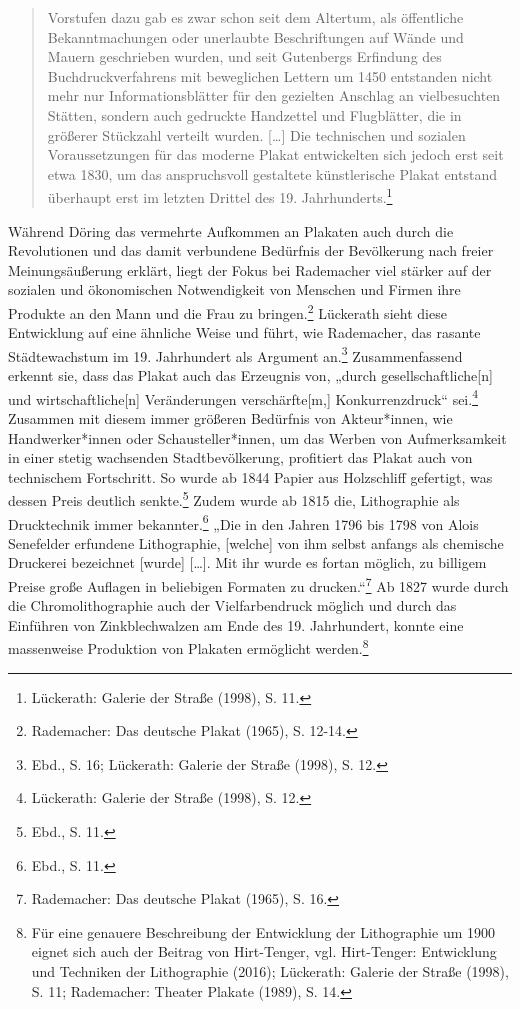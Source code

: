 \documentclass[a4paper,12pt,ngerman]{article}
\begin{document}
\blockquote{\fontsize{10pt}{12pt}\selectfont Vorstufen dazu gab es zwar schon seit dem Altertum, als öffentliche Bekanntmachungen oder unerlaubte Beschriftungen auf Wände und Mauern geschrieben wurden, und seit Gutenbergs Erfindung des Buchdruckverfahrens mit beweglichen Lettern um 1450 entstanden nicht mehr nur Informationsblätter für den gezielten Anschlag an vielbesuchten Stätten, sondern auch gedruckte Handzettel und Flugblätter, die in größerer Stückzahl verteilt wurden. […] Die technischen und sozialen Voraussetzungen für das moderne Plakat entwickelten sich jedoch erst seit etwa 1830, um das anspruchsvoll gestaltete künstlerische Plakat entstand überhaupt erst im letzten Drittel des 19. Jahrhunderts.\footnote{Lückerath: Galerie der Straße (1998), S. 11.}}


Während Döring das vermehrte Aufkommen an Plakaten auch durch die Revolutionen und das damit verbundene Bedürfnis der Bevölkerung nach freier Meinungsäußerung erklärt, liegt der Fokus bei Rademacher viel stärker auf der sozialen und ökonomischen Notwendigkeit von Menschen und Firmen ihre Produkte an den Mann und die Frau zu bringen.\footnote{Rademacher: Das deutsche Plakat (1965), S. 12-14.}  Lückerath sieht diese Entwicklung auf eine ähnliche Weise und führt, wie Rademacher, das rasante Städtewachstum im 19. Jahrhundert als Argument an.\footnote{Ebd., S. 16; Lückerath: Galerie der Straße (1998), S. 12.}  Zusammenfassend erkennt sie, dass das Plakat auch das Erzeugnis von, „durch gesellschaftliche[n] und wirtschaftliche[n] Veränderungen verschärfte[m,] Konkurrenzdruck“ sei.\footnote{Lückerath: Galerie der Straße (1998), S. 12.} \\
Zusammen mit diesem immer größeren Bedürfnis von Akteur*innen, wie Handwerker*innen oder Schausteller*innen, um das Werben von Aufmerksamkeit in einer stetig wachsenden Stadtbevölkerung, profitiert das Plakat auch von technischem Fortschritt. So wurde ab 1844 Papier aus Holzschliff gefertigt, was dessen Preis deutlich senkte.\footnote{Ebd., S. 11.} Zudem wurde ab 1815 die, Lithographie als Drucktechnik immer bekannter.\footnote{Ebd., S. 11.}  „Die in den Jahren 1796 bis 1798 von Alois Senefelder erfundene Lithographie, [welche] von ihm selbst anfangs als chemische Druckerei bezeichnet [wurde] […]. Mit ihr wurde es fortan möglich, zu billigem Preise große Auflagen in beliebigen Formaten zu drucken.“\footnote{Rademacher: Das deutsche Plakat (1965), S. 16.} Ab 1827 wurde durch die Chromolithographie auch der Vielfarbendruck möglich und durch das Einführen von Zinkblechwalzen am Ende des 19. Jahrhundert, konnte eine massenweise Produktion von Plakaten ermöglicht werden.\footnote{Für eine genauere Beschreibung der Entwicklung der Lithographie um 1900 eignet sich auch der Beitrag von Hirt-Tenger, vgl. Hirt-Tenger: Entwicklung und Techniken der Lithographie (2016); Lückerath: Galerie der Straße (1998), S. 11; Rademacher: Theater Plakate (1989), S. 14.} \\ 
\end{document}
